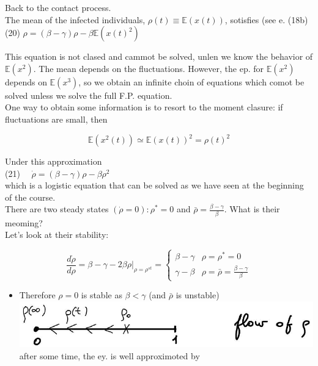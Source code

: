 \documentclass[10pt]{article}
\begin{document}
Back to the contact process.\\
The mean of the infected individuals, $\rho(t) \equiv \mathbb{E}(x(t))$, sotisfies (see e. (18b)\\
(20) $\rho=(\beta-\gamma) \rho-\beta \mathbb{E}\left(x(t)^{2}\right)$

This equation is not clased and cammot be solved, unlen we know the behavior of $\mathbb{E}\left(x^{2}\right)$. The mean depends on the fluctuations. However, the ep. for $\mathbb{E}\left(x^{2}\right)$ depends on $\mathbb{E}\left(x^{3}\right)$, so we obtain an infinite choin of equations which comot be solved unless we solve the full F.P. equation.\\
One way to obtain some information is to resort to the moment clasure: if fluctuations are small, then

$$
\mathbb{E}\left(x^{2}(t)\right) \simeq \mathbb{E}(x(t))^{2}=\rho(t)^{2}
$$

Under this approximation\\
(21) $\quad \dot{\rho}=(\beta-\gamma) \rho-\beta \rho^{2}$\\
which is a logistic equation that can be solved as we have seen at the beginning of the course.\\
There are two steady states $(\dot{\rho}=0): \rho^{*}=0$ and $\bar{\rho}=\frac{\beta-\gamma}{\beta}$. What is their meoming?\\
Let's look at their stability:

$$
\frac{d \dot{\rho}}{d \rho}=\beta-\gamma-\left.2 \beta \rho\right|_{\rho=\rho^{s t}}=\left\{\begin{array}{cc}
\beta-\gamma & \rho=\rho^{*}=0 \\
\gamma-\beta & \rho=\bar{\rho}=\frac{\beta-\gamma}{\beta}
\end{array}\right.
$$

\begin{itemize}
  \item Therefore $\rho=0$ is stable as $\beta<\gamma$ (and $\bar{\rho}$ is unstable)\\
\includegraphics[max width=\textwidth, center]{2025_10_17_3daf2a002a8f5936c90eg-12}\\
after some time, the ey. is well approximoted by
\end{itemize}
\end{document}
